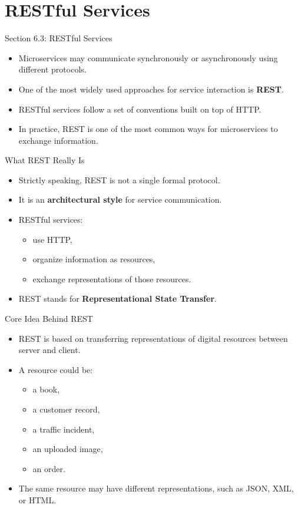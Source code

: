 \section{RESTful Services}

\begin{frame}{Section 6.3: RESTful Services}
\begin{itemize}
    \item Microservices may communicate synchronously or asynchronously using different protocols.
    \item One of the most widely used approaches for service interaction is \textbf{REST}.
    \item RESTful services follow a set of conventions built on top of HTTP.
    \item In practice, REST is one of the most common ways for microservices to exchange information.
\end{itemize}
\end{frame}

\begin{frame}{What REST Really Is}
\begin{itemize}
    \item Strictly speaking, REST is not a single formal protocol.
    \item It is an \textbf{architectural style} for service communication.
    \item RESTful services:
    \begin{itemize}
        \item use HTTP,
        \item organize information as resources,
        \item exchange representations of those resources.
    \end{itemize}
    \item REST stands for \textbf{Representational State Transfer}.
\end{itemize}
\end{frame}

\begin{frame}{Core Idea Behind REST}
\begin{itemize}
    \item REST is based on transferring representations of digital resources between server and client.
    \item A resource could be:
    \begin{itemize}
        \item a book,
        \item a customer record,
        \item a traffic incident,
        \item an uploaded image,
        \item an order.
    \end{itemize}
    \item The same resource may have different representations, such as JSON, XML, or HTML.
\end{itemize}
\end{frame}

